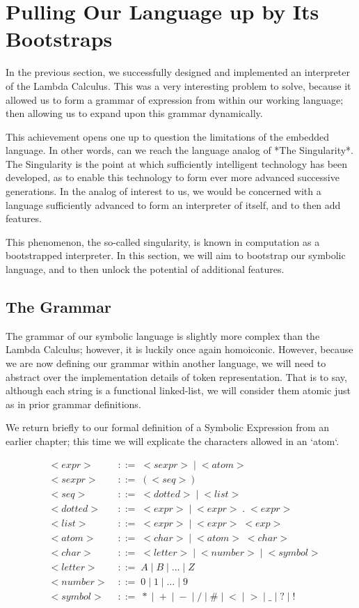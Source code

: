 
\chapter{Pulling Our Language up by Its Bootstraps}
In the previous section, we successfully designed and implemented an
interpreter of the Lambda Calculus. This was a very interesting problem to
solve, because it allowed us to form a grammar of expression from within our working language; then allowing us to expand upon this grammar dynamically.

This achievement opens one up to question the limitations of the embedded
language. In other words, can we reach the language analog of *The 
Singularity*. The Singularity is the point at which sufficiently intelligent 
technology has been developed, as to enable this technology to form ever more 
advanced successive generations. In the analog of interest to us, we would be 
concerned with a language sufficiently advanced to form an interpreter of 
itself, and to then add features.

This phenomenon, the so-called singularity, is known in computation as a 
bootstrapped interpreter. In this section, we will aim to bootstrap our 
symbolic language, and to then unlock the potential of additional features.

\section{The Grammar}
The grammar of our symbolic language is slightly more complex than the Lambda 
Calculus; however, it is luckily once again homoiconic. However, because we 
are now defining our grammar within another language, we will need to 
abstract over the implementation details of token representation. That is to 
say, although each string is a functional linked-list, we will consider them 
atomic just as in prior grammar definitions.

We return briefly to our formal definition of a Symbolic Expression from an 
earlier chapter; this time we will explicate the characters allowed in an 
`atom`.

\begin{align*}
& <expr> \; &::= \; <sexpr> \; | \; <atom>
\\& <sexpr> \; &::= \; (<seq>)
\\& <seq> \; &::= \; <dotted> \; | \; <list>
\\& <dotted> \; &::= \; <expr> \; | \; <expr> \; . \; <expr>
\\& <list> \; &::= \; <expr> \; | \; <expr> \; <exp>
\\& <atom> \; &::= \; <char> \; | \; <atom> \; <char>
\\& <char> \; &::= \; <letter> \; | \; <number> \; | \; <symbol>
\\& <letter> \; &::= \; A \; | \; B \; | \; \dots \; | \; Z
\\& <number> \; &::= \; 0 \; | \; 1 \; | \; \dots \; | \; 9
\\& <symbol> \; &::= \; * \; | \; + \; | \; - \; | \; / \; | \; \# \; | \; < \; | \; > \; | \; \_ \; | \; ? \; | \; !
\end{align*}

